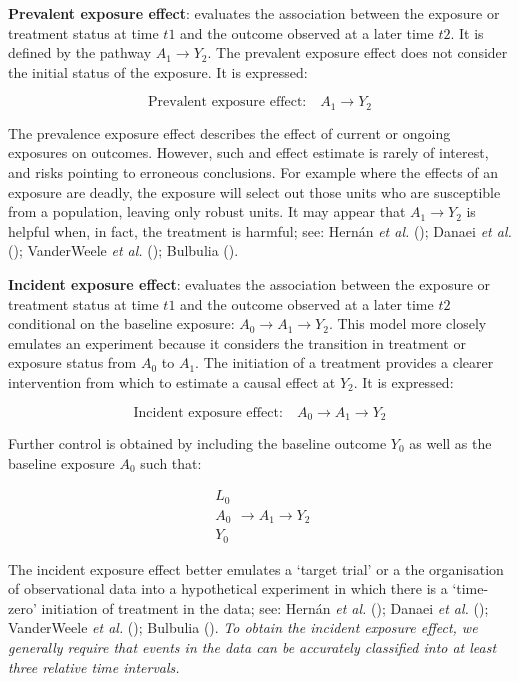 \documentclass[
  singlecolumn]{article}
\begin{document}
\textbf{Prevalent exposure effect}: evaluates the association between
the exposure or treatment status at time \(t1\) and the outcome observed
at a later time \(t2\). It is defined by the pathway
\(A_{1} \to Y_{2}\). The prevalent exposure effect does not consider the
initial status of the exposure. It is expressed:

\[
\text{Prevalent exposure effect:} \quad A_{1} \to Y_{2}
\]

The prevalence exposure effect describes the effect of current or
ongoing exposures on outcomes. However, such and effect estimate is
rarely of interest, and risks pointing to erroneous conclusions. For
example where the effects of an exposure are deadly, the exposure will
select out those units who are susceptible from a population, leaving
only robust units. It may appear that \(A_{1} \to Y_{2}\) is helpful
when, in fact, the treatment is harmful; see: Hernán \emph{et al.}
(); Danaei \emph{et al.}
(); VanderWeele \emph{et al.}
(); Bulbulia
().

\textbf{Incident exposure effect}: evaluates the association between the
exposure or treatment status at time \(t1\) and the outcome observed at
a later time \(t2\) conditional on the baseline exposure:
\(A_{0} \to A_{1} \to Y_{2}\). This model more closely emulates an
experiment because it considers the transition in treatment or exposure
status from \(A_0\) to \(A_1\). The initiation of a treatment provides a
clearer intervention from which to estimate a causal effect at \(Y_2\).
It is expressed:

\[
\text{Incident exposure effect:} \quad \boxed{A_{0}} \to A_{1} \to Y_{2}
\]

Further control is obtained by including the baseline outcome \(Y_0\) as
well as the baseline exposure \(A_0\) such that:

\[
\boxed{
\begin{aligned}
L_{0} \\
A_{0} \\
Y_{0}
\end{aligned}
}
\to A_{1} \to Y_{2}
\]

The incident exposure effect better emulates a `target trial' or a the
organisation of observational data into a hypothetical experiment in
which there is a `time-zero' initiation of treatment in the data; see:
Hernán \emph{et al.} (); Danaei
\emph{et al.} (); VanderWeele \emph{et
al.} (); Bulbulia
(). \emph{To obtain the incident
exposure effect, we generally require that events in the data can be
accurately classified into at least three relative time intervals.}
\end{document}
